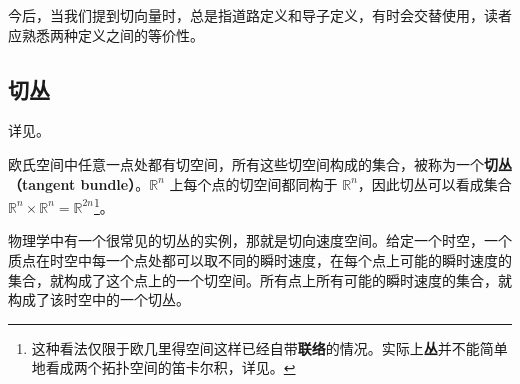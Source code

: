 今后，当我们提到切向量时，总是指道路定义和导子定义，有时会交替使用，读者应熟悉两种定义之间的等价性。

\subsection{切丛}
详见。

欧氏空间中任意一点处都有切空间，所有这些切空间构成的集合，被称为一个\textbf{切丛（tangent bundle）}。$\mathbb{R}^n$ 上每个点的切空间都同构于 $\mathbb{R}^n$，因此切丛可以看成集合 $\mathbb{R}^n\times\mathbb{R}^n=\mathbb{R}^{2n}$\footnote{这种看法仅限于欧几里得空间这样已经自带\textbf{联络}的情况。实际上\textbf{丛}并不能简单地看成两个拓扑空间的笛卡尔积，详见。}。

物理学中有一个很常见的切丛的实例，那就是切向速度空间。给定一个时空，一个质点在时空中每一个点处都可以取不同的瞬时速度，在每个点上可能的瞬时速度的集合，就构成了这个点上的一个切空间。所有点上所有可能的瞬时速度的集合，就构成了该时空中的一个切丛。









